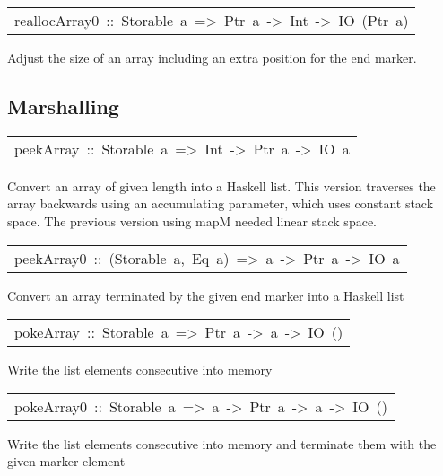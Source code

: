 \begin{haddockdesc}
\item[\begin{tabular}{@{}l}
reallocArray0\ ::\ Storable\ a\ =>\ Ptr\ a\ ->\ Int\ ->\ IO\ (Ptr\ a)
\end{tabular}]\haddockbegindoc
Adjust the size of an array including an extra position for the end marker.
\par

\end{haddockdesc}
\subsection{Marshalling
}
\begin{haddockdesc}
\item[\begin{tabular}{@{}l}
peekArray\ ::\ Storable\ a\ =>\ Int\ ->\ Ptr\ a\ ->\ IO\ {\char 91}a{\char 93}
\end{tabular}]\haddockbegindoc
Convert an array of given length into a Haskell list.  This version
 traverses the array backwards using an accumulating parameter,
 which uses constant stack space.  The previous version using mapM
 needed linear stack space.
\par

\end{haddockdesc}
\begin{haddockdesc}
\item[\begin{tabular}{@{}l}
peekArray0\ ::\ (Storable\ a,\ Eq\ a)\ =>\ a\ ->\ Ptr\ a\ ->\ IO\ {\char 91}a{\char 93}
\end{tabular}]\haddockbegindoc
Convert an array terminated by the given end marker into a Haskell list
\par

\end{haddockdesc}
\begin{haddockdesc}
\item[\begin{tabular}{@{}l}
pokeArray\ ::\ Storable\ a\ =>\ Ptr\ a\ ->\ {\char 91}a{\char 93}\ ->\ IO\ ()
\end{tabular}]\haddockbegindoc
Write the list elements consecutive into memory
\par

\end{haddockdesc}
\begin{haddockdesc}
\item[\begin{tabular}{@{}l}
pokeArray0\ ::\ Storable\ a\ =>\ a\ ->\ Ptr\ a\ ->\ {\char 91}a{\char 93}\ ->\ IO\ ()
\end{tabular}]\haddockbegindoc
Write the list elements consecutive into memory and terminate them with the
 given marker element
\par

\end{haddockdesc}
